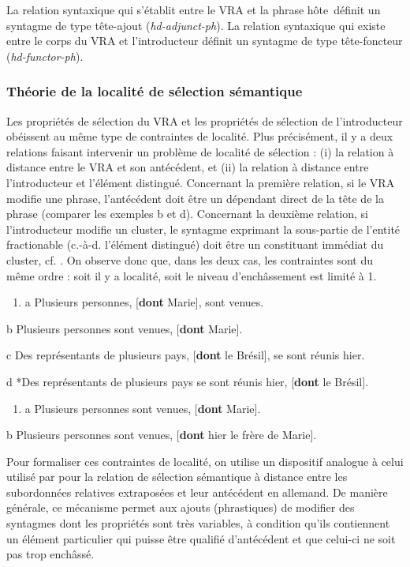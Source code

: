 La relation syntaxique qui s'établit entre le VRA et la phrase hôte~définit un syntagme de type tête-ajout (\textit{hd-adjunct-ph}). La relation syntaxique qui existe entre le corps du VRA et l'introducteur définit un syntagme de type tête-foncteur (\textit{hd-functor-ph}). 

\subsubsection{Théorie de la localité de sélection sémantique}
\label{bkm:Ref299031107}Les propriétés de sélection du VRA et les propriétés de sélection de l'introducteur obéissent au même type de contraintes de localité. Plus précisément, il y a deux relations faisant intervenir un problème de localité de sélection : (i) la relation à distance entre le VRA et son antécédent, et (ii) la relation à distance entre l'introducteur et l'élément distingué. Concernant la première relation, si le VRA modifie une phrase, l'antécédent doit être un dépendant direct de la tête de la phrase (comparer les exemples b et d). Concernant la deuxième relation, si l'introducteur modifie un cluster, le syntagme exprimant la sous-partie de l'entité fractionable (c.-à-d. l'élément distingué) doit être un constituant immédiat du cluster, cf. . On observe donc que, dans les deux cas, les contraintes sont du même ordre : soit il y a localité, soit le niveau d'enchâssement est limité à 1.


\begin{enumerate}
\item \label{bkm:Ref296092613}a  Plusieurs personnes, [\textbf{dont} Marie], sont venues. 


\end{enumerate}
  b  Plusieurs personnes sont venues, [\textbf{dont} Marie].

  c  Des représentants de plusieurs pays, [\textbf{dont} le Brésil], se sont réunis hier.

  d  *Des représentants de plusieurs pays se sont réunis hier, [\textbf{dont} le Brésil].


\begin{enumerate}
\item \label{bkm:Ref296092705}a  Plusieurs personnes sont venues, [\textbf{dont} Marie]. 


\end{enumerate}
  b  Plusieurs personnes sont venues, [\textbf{dont} hier le frère de Marie].

Pour formaliser ces contraintes de localité, on utilise un dispositif analogue à celui utilisé par \citet{Kiss2005} pour la relation de sélection sémantique à distance entre les subordonnées relatives extraposées et leur antécédent en allemand. De manière générale, ce mécanisme permet aux ajouts (phrastiques) de modifier des syntagmes dont les propriétés sont très variables, à condition qu'ils contiennent un élément particulier qui puisse être qualifié d'antécédent et que celui-ci ne soit pas trop enchâssé. 


